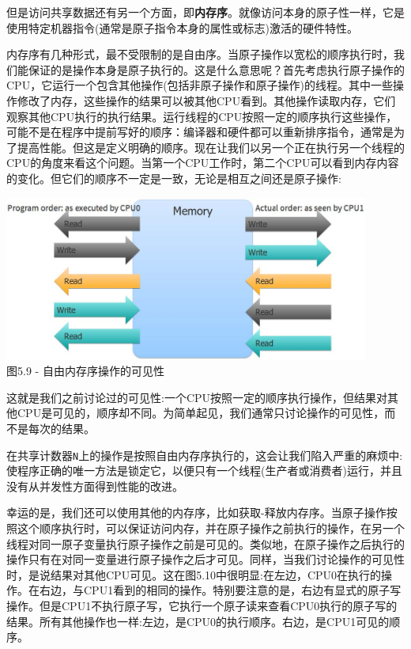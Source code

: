 但是访问共享数据还有另一个方面，即\textbf{内存序}。就像访问本身的原子性一样，它是使用特定机器指令(通常是原子指令本身的属性或标志)激活的硬件特性。

内存序有几种形式，最不受限制的是自由序。当原子操作以宽松的顺序执行时，我们能保证的是操作本身是原子执行的。这是什么意思呢？首先考虑执行原子操作的CPU，它运行一个包含其他操作(包括非原子操作和原子操作)的线程。其中一些操作修改了内存，这些操作的结果可以被其他CPU看到。其他操作读取内存，它们观察其他CPU执行的执行结果。运行线程的CPU按照一定的顺序执行这些操作，可能不是在程序中提前写好的顺序：编译器和硬件都可以重新排序指令，通常是为了提高性能。但这是定义明确的顺序。现在让我们以另一个正在执行另一个线程的CPU的角度来看这个问题。当第一个CPU工作时，第二个CPU可以看到内存内容的变化。但它们的顺序不一定是一致，无论是相互之间还是原子操作:

\begin{center}
\includegraphics[width=0.9\textwidth]{content/1/chapter5/images/9.jpg}\\
图5.9 - 自由内存序操作的可见性
\end{center}

这就是我们之前讨论过的可见性:一个CPU按照一定的顺序执行操作，但结果对其他CPU是可见的，顺序却不同。为简单起见，我们通常只讨论操作的可见性，而不是每次的结果。

在共享计数器\texttt{N}上的操作是按照自由内存序执行的，这会让我们陷入严重的麻烦中:使程序正确的唯一方法是锁定它，以便只有一个线程(生产者或消费者)运行，并且没有从并发性方面得到性能的改进。

幸运的是，我们还可以使用其他的内存序，比如获取-释放内存序。当原子操作按照这个顺序执行时，可以保证访问内存，并在原子操作之前执行的操作，在另一个线程对同一原子变量执行原子操作之前是可见的。类似地，在原子操作之后执行的操作只有在对同一变量进行原子操作之后才可见。同样，当我们讨论操作的可见性时，是说结果对其他CPU可见。这在图5.10中很明显:在左边，CPU0在执行的操作。在右边，与CPU1看到的相同的操作。特别要注意的是，右边有显式的原子写操作。但是CPU1不执行原子写，它执行一个原子读来查看CPU0执行的原子写的结果。所有其他操作也一样:左边，是CPU0的执行顺序。右边，是CPU1可见的顺序。

